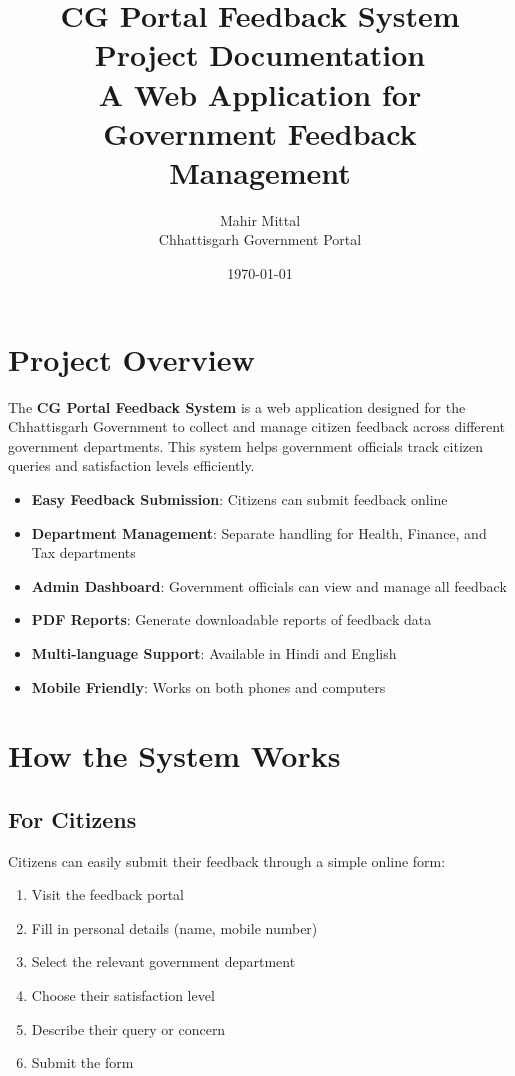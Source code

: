 \documentclass[12pt,a4paper]{article}
\title{
    \vspace{-2cm}
    {\Huge\bfseries CG Portal Feedback System}\\[0.5cm]
    {\Large Project Documentation}\\[1cm]
    {\large A Web Application for Government Feedback Management}
}
\author{
    \large Mahir Mittal\\[0.5cm]
    \large Chhattisgarh Government Portal
}
\date{\today}
\begin{document}
\maketitle
\newpage

\tableofcontents
\newpage

\section{Project Overview}

The \textbf{CG Portal Feedback System} is a web application designed for the Chhattisgarh Government to collect and manage citizen feedback across different government departments. This system helps government officials track citizen queries and satisfaction levels efficiently.

\begin{tcolorbox}[colback=lightgray,colframe=cgblue,title=Main Features]
\begin{itemize}[leftmargin=*]
    \item \textbf{Easy Feedback Submission}: Citizens can submit feedback online
    \item \textbf{Department Management}: Separate handling for Health, Finance, and Tax departments
    \item \textbf{Admin Dashboard}: Government officials can view and manage all feedback
    \item \textbf{PDF Reports}: Generate downloadable reports of feedback data
    \item \textbf{Multi-language Support}: Available in Hindi and English
    \item \textbf{Mobile Friendly}: Works on both phones and computers
\end{itemize}
\end{tcolorbox}

\section{How the System Works}

\subsection{For Citizens}
Citizens can easily submit their feedback through a simple online form:
\begin{enumerate}
    \item Visit the feedback portal
    \item Fill in personal details (name, mobile number)
    \item Select the relevant government department
    \item Choose their satisfaction level
    \item Describe their query or concern
    \item Submit the form
\end{enumerate}
\end{document}
